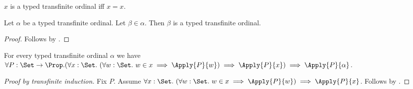 \begin{definition}\label{typed_transfinite_guard}
    $x$ is a typed transfinite ordinal iff $x=x$.
\end{definition}

\begin{proposition}\label{typed_transfinite_guard_hereditary}
    Let $\alpha$ be a typed transfinite ordinal.
    Let $\beta\in\alpha$.
    Then $\beta$ is a typed transfinite ordinal.
\end{proposition}
\begin{proof}
    Follows by .
\end{proof}

\begin{theorem}\label{typed_transfinite_induction}
    For every typed transfinite ordinal $\alpha$ we have
    $\forall P:\Set\to\Prop.
        (\forall x:\Set.\ (\forall w:\Set.\ w\in x\implies\Apply{P}{w})
             \implies\Apply{P}{x})
        \implies\Apply{P}{\alpha}$.
\end{theorem}
\begin{proof}[Proof by transfinite induction]
    Fix $P$.
    Assume $\forall x:\Set.\ (\forall w:\Set.\ w\in x\implies\Apply{P}{w})
         \implies\Apply{P}{x}$.
    Follows by \auto.
\end{proof}
